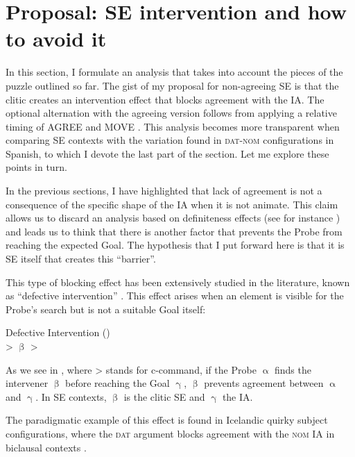 \documentclass[output=paper,colorlinks,citecolor=brown]{langscibook}
\begin{document}
\section{Proposal: SE intervention and how to avoid it} \label{05:proposal}

In this section, I formulate an analysis that takes into account the pieces of the puzzle outlined so far. The gist of my proposal for non-agreeing SE is that the clitic creates an intervention effect that blocks agreement with the IA. The optional alternation with the agreeing version follows from applying a relative timing of AGREE and MOVE \citep{Obataetal2015,Obata_Epstein2016}. This analysis becomes more transparent when comparing SE contexts with the variation found in \textsc{dat-nom} configurations in Spanish, to which I devote the last part of the section. Let me explore these points in turn.

In the previous sections, I have highlighted that lack of agreement is not a consequence of the specific shape of the IA  when it is not animate. This claim allows us to discard an analysis based on definiteness effects (see for instance \citealt{Belletti1988a}) and leads us to think that there is another factor that prevents the Probe from reaching the expected Goal. The hypothesis that I put forward here is that it is SE itself that creates this ``barrier''.

This type of blocking effect has been extensively studied in the literature, known as ``defective intervention''  \citep{Chomsky2000}. This effect arises when an element is visible for the Probe's search but is not a suitable Goal itself:

\ea \label{ex:05:esqintervention} Defective Intervention (\citealt[69]{Hiraiwa2001}) \\
\ConnectTail{*$\upalpha$} > $\upbeta$ > \ConnectHead [2ex] {$\upgamma$}
\z
\vspace{3mm}

As we see in , where > stands for c-command, if the Probe $\upalpha$ finds the intervener $\upbeta$ before reaching the Goal $\upgamma$, $\upbeta$ prevents agreement between $\upalpha$ and $\upgamma$. In SE contexts, $\upbeta$ is the clitic SE and $\upgamma$ the IA.

The paradigmatic example of this effect is found in Icelandic quirky subject configurations, where the \textsc{dat} argument blocks agreement with the \textsc{nom} IA in biclausal contexts \citep{Sigurdsson1992, Boeckx2000, Holmberg&Hroasdottir2003, Sirg_Holm2008, Preminger2014}.
\end{document}
